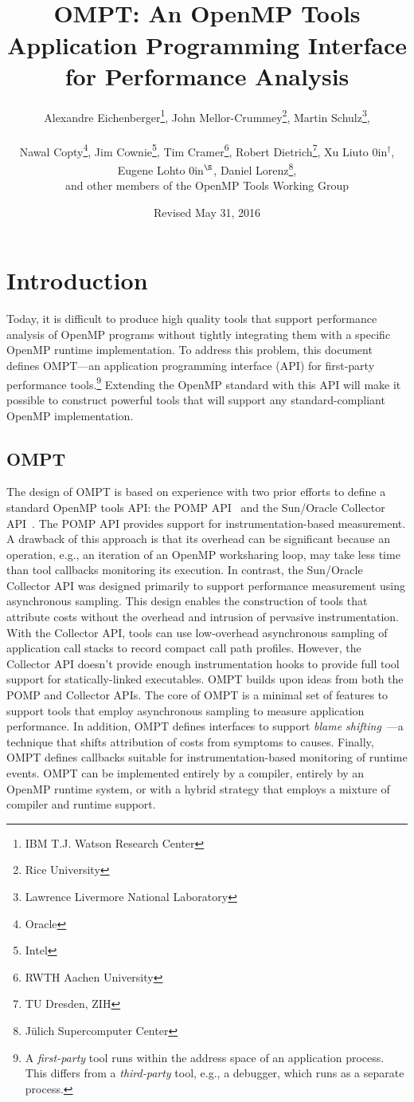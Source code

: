 \documentclass{article}
\title{OMPT: An OpenMP\textsuperscript{\textregistered} Tools Application Programming Interface for Performance Analysis}
\author{Alexandre Eichenberger\thanks{IBM T.J. Watson Research Center}, 
John Mellor-Crummey\thanks{Rice University}, 
Martin Schulz\thanks{Lawrence Livermore National Laboratory},
\\~\\
Nawal Copty\thanks{Oracle}, 
Jim Cownie\thanks{Intel},
Tim Cramer\thanks{RWTH Aachen University}, 
Robert Dietrich\thanks{TU Dresden, ZIH},
Xu Liu\hbox to 0in{$^\dagger$\hss},
Eugene Loh\hbox to 0in{$^\S$\hss}, 
Daniel Lorenz\thanks{J\"{u}lich Supercomputer Center}, 
\\
and other members of the OpenMP Tools Working Group}
\date{Revised May 31, 2016}
\begin{document}
  

\maketitle
\section{Introduction}
Today, it is difficult to produce high quality tools that support 
performance analysis of OpenMP programs without tightly integrating them with a specific OpenMP runtime implementation. To address this problem, this document defines OMPT---an application programming interface (API) for first-party performance tools.\footnote{A {\em first-party} tool runs within the address space of an application process. This differs from a {\em third-party} tool, e.g., a debugger, which runs as a separate process.}  
Extending the OpenMP standard with this API  will make it possible to construct powerful tools that will support any standard-compliant OpenMP implementation.

\subsection{OMPT}

The design of OMPT is based on experience with two prior efforts to define a standard OpenMP tools API: the POMP API~\cite{Mohr:EWOMP02} and the Sun/Oracle Collector API~\cite{SunCollector,Jost:2005:AND:1892830.1892858}. 
The POMP API provides support for instrumentation-based measurement. A drawback of this approach  is that its overhead can be significant because an operation, e.g., an iteration of an OpenMP worksharing loop, may take less time than tool callbacks monitoring its execution. 
In contrast, 
the Sun/Oracle Collector API was  designed primarily to support performance measurement 
using asynchronous sampling. This  design enables the construction of tools that attribute costs without the overhead and intrusion of pervasive instrumentation. With the Collector API, tools
 can use low-overhead asynchronous  sampling of application call stacks to record compact call path profiles. However, the Collector API doesn't provide enough instrumentation hooks to provide full tool support for statically-linked executables.
OMPT builds upon ideas from both the POMP and  Collector APIs. The core of OMPT is a minimal set of features to support tools that employ asynchronous sampling to measure application performance. In addition, OMPT defines  interfaces to support  {\em blame shifting}~\cite{Tallent:PPoPP09,Tallent:PPoPP10}---a technique that shifts attribution of costs from symptoms to causes.
Finally, OMPT defines callbacks suitable for instrumentation-based monitoring of runtime events. 
 OMPT can be implemented entirely by a compiler, entirely by an OpenMP runtime system, or with a hybrid strategy that employs a mixture of compiler and runtime support.
\end{document}
